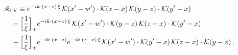 \begingroup\small
\begin{align}\label{eq:K-rm_I_V}
&\mathfrak{K}_{\rm I.V}\equiv e^{-ik\cdot(x-z)\,\xi}\, \mathcal{K}(x'-w')\cdot\mathcal{K}(z-x)\, \mathcal{K}(y-z)\cdot\mathcal{K}(y'-x)\notag\\
&\quad -\Big[\frac{1}{\xi}\Big]_{+}e^{-ik\cdot(x-z)\,\xi}\, \mathcal{K}(x'-w')\cdot\mathcal{K}(y-z)\, \mathcal{K}(z-x)\cdot\mathcal{K}(y'-x)\notag\\
&\quad -\Big[\frac{1}{\xi}\Big]_{+}e^{-ik\cdot(x-z)}e^{-ik\cdot(z-x)\,\xi}\, \mathcal{K}(x'-w')\cdot\mathcal{K}(y'-x)\, \mathcal{K}(z-x)\cdot\mathcal{K}(y-z)\,.
\end{align}
\endgroup
